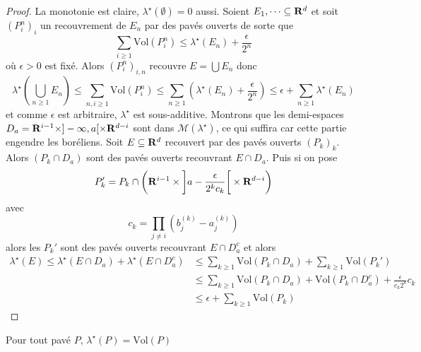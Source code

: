 \begin{proof}
    La monotonie est claire, $\lambda^\star(\emptyset)=0$ aussi. Soient  $E_1, \cdots \subseteq \mathbf R^d$ et soit $(P_i^n)_i$ un recouvrement de $E_n$ par des pavés ouverts de sorte que  \[
        \sum_{i\geq 1}\mathrm{Vol}(P_i^n)\leq \lambda^\star(E_n)+\frac{\epsilon}{2^n}
    \] 
    où $ \epsilon>0$ est fixé. Alors $(P_i^n)_{i,n}$ recouvre $E=\bigcup E_n$ donc \[
        \lambda^\star \left( \bigcup_{n\geq 1}E_n \right) \leq \sum_{n,i\geq 1} \mathrm{Vol}(P_i^n) \leq \sum_{n\geq 1} \left( \lambda^\star(E_n)+ \frac{\epsilon}{2^n} \right)\leq \epsilon + \sum_{n\geq 1}\lambda^\star(E_n)
    \] 
    et comme $\epsilon$ est arbitraire,  $\lambda^\star$ est sous-additive. Montrons que les demi-espaces $D_a=\mathbf R^{i-1}\times ]-\infty, a[\times \mathbf R^{d-i}$ sont dans $\mathcal  M(\lambda^\star)$, ce qui suffira car cette partie engendre les boréliens. Soit $E \subseteq \mathbf R^d$ recouvert par des pavés ouverts $(P_k)_k$. Alors  $(P_k\cap D_a)$ sont des pavés ouverts recouvrant  $E\cap D_a$. Puis si on pose  \[
        P_k'=P_k\cap\left(\mathbf R^{i-1}\times \left]a-\frac{\epsilon}{2^kc_k}\right[\times \mathbf R^{d-i}\right)
    \]
    avec \[c_k=\prod_{j\neq i}(b_j^{(k)}-a_j^{(k)})\] alors les $P_k'$ sont des pavés ouverts recouvrant  $E\cap D_a^c$ et alors  \begin{align*}
    \lambda^\star(E)\leq \lambda^\star(E\cap D_a)+\lambda^\star(E\cap D_a^c)&\leq \sum_{k\geq 1}\mathrm{Vol}(P_k\cap D_a)+\sum_{k\geq 1}\mathrm{Vol}(P_k')\\&\leq \sum_{k\geq 1}\mathrm{Vol}(P_k\cap D_a)+\mathrm{Vol}(P_k\cap D_a^c)+ \frac{\epsilon}{c_k2^k}c_k\\&\leq \epsilon+\sum_{k\geq 1}\mathrm{Vol}(P_k)
\end{align*}
\end{proof}

\begin{prop}
    Pour tout pavé $P$,  $\lambda^\star(P)=\mathrm{Vol}(P)$
\end{prop}
